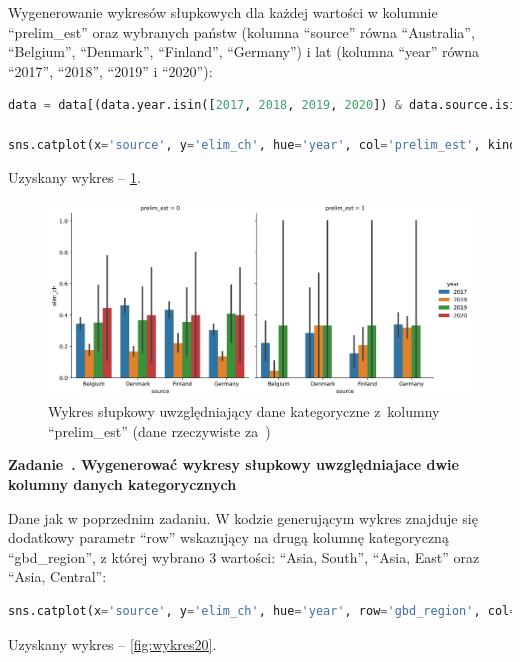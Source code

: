\documentclass[11pt]{report}
\newcounter{zadanie}
\newcommand{\zadanie}[1]{
    \refstepcounter{zadanie}
    \filbreak\vspace*{1cm}
    {\noindent\raggedright\Large \textbf{Zadanie~\thezadanie. #1}}
    \vspace{10 pt}\nopagebreak[1]
}
\begin{document}
Wygenerowanie wykresów słupkowych dla każdej wartości w kolumnie \enquote{prelim\_est}
oraz wybranych państw (kolumna \enquote{source} równa \enquote{Australia}, \enquote{Belgium}, \enquote{Denmark}, \enquote{Finland}, \enquote{Germany})
i lat (kolumna \enquote{year} równa \enquote{2017}, \enquote{2018}, \enquote{2019} i \enquote{2020}):

\begin{lstlisting}[language=Python]
data = data[(data.year.isin([2017, 2018, 2019, 2020]) & data.source.isin(['Austrialia', 'Belgium', 'Denmark', 'Finland', 'Germany']))]

sns.catplot(x='source', y='elim_ch', hue='year', col='prelim_est', kind='bar', data=data)
\end{lstlisting}

Uzyskany wykres -- \ref{fig:wykres19}.

\begin{figure}[h]
    \caption{Wykres słupkowy uwzględniający dane kategoryczne z~kolumny \enquote{prelim\_est} (dane rzeczywiste za~\cite{daneMedyczne})}
    \label{fig:wykres19}
    \centering
    \includegraphics[width=.8\textwidth]{wykres20}
\end{figure}

\zadanie{Wygenerować wykresy słupkowy uwzględniajace dwie kolumny danych kategorycznych}

Dane jak w poprzednim zadaniu. W kodzie generującym wykres znajduje się dodatkowy parametr \enquote{row} wskazujący
na drugą kolumnę kategoryczną \enquote{gbd\_region}, z której wybrano 3 wartości:
\enquote{Asia, South}, \enquote{Asia, East} oraz \enquote{Asia, Central}:

\begin{lstlisting}[language=Python]
    sns.catplot(x='source', y='elim_ch', hue='year', row='gbd_region', col='prelim_est', kind='bar', data=data[data.gbd_region.isin(['Asia, South', 'Asia, East', 'Asia, Central'])])
\end{lstlisting}

Uzyskany wykres -- \ref{fig:wykres20}.
\end{document}
